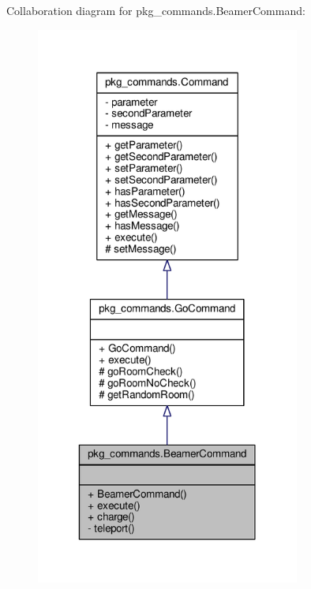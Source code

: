 Collaboration diagram for pkg\-\_\-commands.\-Beamer\-Command\-:\nopagebreak
\begin{figure}[H]
\begin{center}
\leavevmode
\includegraphics[width=246pt]{classpkg__commands_1_1BeamerCommand__coll__graph}
\end{center}
\end{figure}
